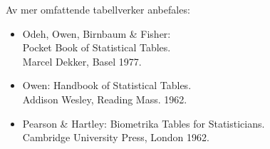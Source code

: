 \noindent Av mer omfattende tabellverker anbefales:
\begin{itemize}
\item[] Odeh, Owen, Birnbaum \& Fisher:\\
        Pocket Book of Statistical Tables.\\
        Marcel Dekker, Basel 1977.
\item[] Owen:  Handbook of Statistical Tables.\\
        Addison Wesley, Reading Mass. 1962.
\item[] Pearson \& Hartley:  Biometrika Tables for Statisticians.\\
        Cambridge University Press, London 1962.
\end{itemize}
